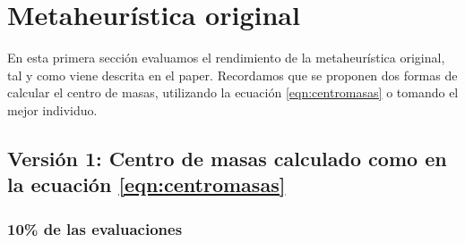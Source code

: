 \section{Metaheurística original}
En esta primera sección evaluamos el rendimiento de la metaheurística original, tal y como viene descrita en el paper. Recordamos que se proponen dos formas de calcular el centro de masas, utilizando la ecuación \ref{eqn:centromasas} o tomando el mejor individuo.

\subsection{Versión 1: Centro de masas calculado como en la ecuación \ref{eqn:centromasas}}

\subsubsection*{10\% de las evaluaciones}

